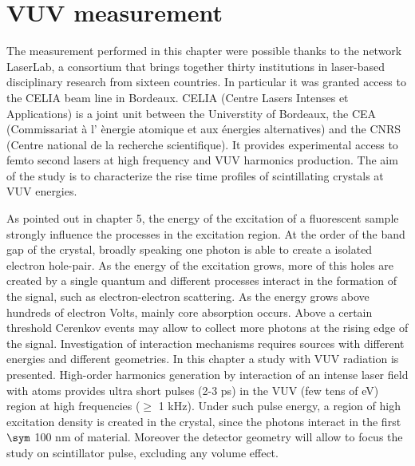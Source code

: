 
\chapter{VUV measurement}
The measurement performed in this chapter were possible thanks to the network LaserLab, a consortium that brings together thirty institutions in laser-based disciplinary research from sixteen countries. In particular it was granted access to the CELIA beam line in Bordeaux.
CELIA (Centre Lasers Intenses et Applications) is a joint unit between the Universtity of Bordeaux, the CEA (Commissariat à l' \`{e}nergie atomique et aux énergies alternatives) and the CNRS (Centre national de la recherche scientifique). It provides experimental access to femto second lasers at high frequency and VUV harmonics production.
The aim of the study is to characterize the rise time profiles of scintillating crystals at VUV energies.

As pointed out in chapter 5, the energy of the excitation of a fluorescent sample strongly influence the processes in the excitation region.
At the order of the band gap of the crystal, broadly speaking one photon is able to create a isolated electron hole-pair. As the energy of the excitation grows, more of this holes are created by a single quantum and different processes interact in the formation of the signal, such as electron-electron scattering.
As the energy grows above hundreds of electron Volts, mainly core absorption occurs. 
Above a certain threshold Cerenkov events may allow to collect more photons at the rising edge of the signal. 
Investigation of interaction mechanisms requires sources with different energies and different geometries.
In this chapter a study with VUV radiation is presented. High-order harmonics generation by interaction of an intense laser field with atoms provides ultra short pulses (2-3 ps) in the VUV (few tens of eV) region at high frequencies ($\geq$ 1 kHz). 
Under such pulse energy, a region of high excitation density is created in the crystal, since the photons interact in the first $\sym$ 100 nm of material.
Moreover the detector geometry will allow to focus the study on scintillator pulse, excluding any volume effect.

